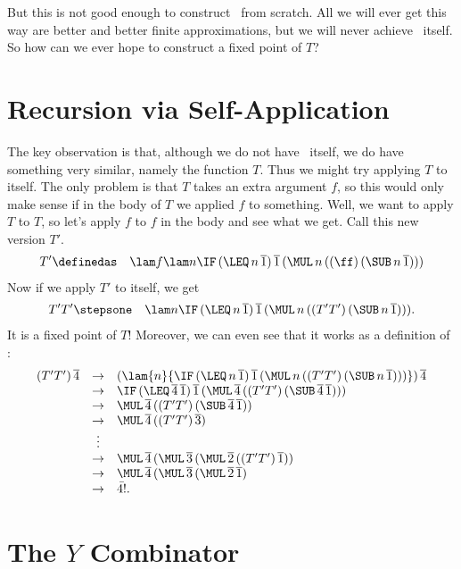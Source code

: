 But this is not good enough to construct \FACT\ from scratch. All we will ever get this way are
better and better finite approximations, but we will never achieve \FACT\ itself.
So how can we ever hope to construct a fixed point of $T$?

\section{Recursion via Self-Application}
\label{sec:self-app}

The key observation is that, although we do not have \FACT\ itself, we do have something very similar, namely the function $T$. Thus we might try applying $T$ to itself. The only problem is that $T$ takes an extra argument $f$, so this would only make sense if in the body of $T$ we applied $f$ to something. Well, we want to apply $T$ to $T$, so let's apply $f$ to $f$ in the body and see what we get. Call this new version $T'$.
\begin{eqnarray*}
T' &\definedas& \lam f{\lam n{\IF\,(\LEQ\,n\,\overline 1)\,\overline 1\,(\MUL\,n\,((\ff)\,(\SUB\,n\,\overline 1)))}}
\end{eqnarray*}
Now if we apply $T'$ to itself, we get
\begin{eqnarray*}
T'T' &\stepsone& \lam n{\IF\,(\LEQ\,n\,\overline 1)\,\overline 1\,(\MUL\,n\,((T'T')\,(\SUB\,n\,\overline 1)))}.
\end{eqnarray*}
It is a fixed point of $T$! Moreover, we can even see that it works as a definition of \FACT:
\[\begin{array}{rcll} 
(T'T')\,\overline 4 &\to& (\lam{n}{\IF\,(\LEQ\,n\,\overline 1)\,\overline 1\,(\MUL\,n\,((T'T')\,(\SUB\,n\,\overline 1)))})\,\overline 4\\
&\to& \IF\,(\LEQ\,\overline 4\,\overline 1)\,\overline 1\,(\MUL\,\overline 4\,((T'T')\,(\SUB\,\overline 4\,\overline 1)))\\
&\to& \MUL\,\overline 4\,((T'T')\,(\SUB\,\overline 4\,\overline 1))\\
&\to& \MUL\,\overline 4\,((T'T')\,\overline 3)\\
&\vdots\\
&\to& \MUL\,\overline 4\,(\MUL\,\overline 3\,(\MUL\,\overline 2\,((T'T')\,\overline 1))\\
&\to& \MUL\,\overline 4\,(\MUL\,\overline 3\,(\MUL\,\overline 2\,\overline 1)\\
&\to& \bar{4!}.
\end{array}\]

\section{The $Y$ Combinator}


